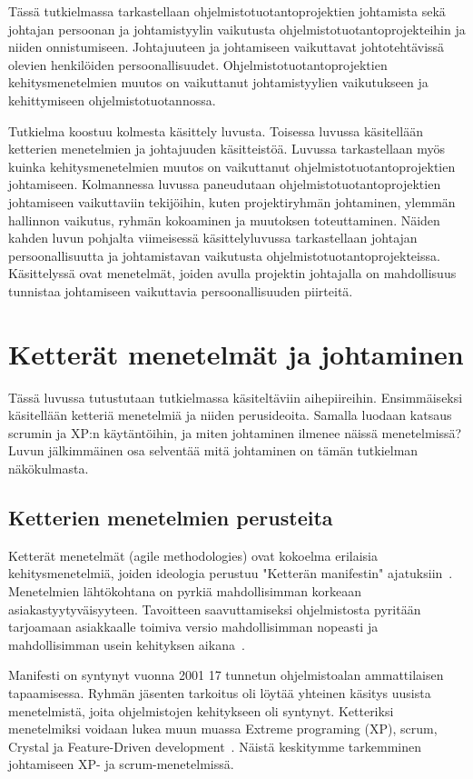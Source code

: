 \documentclass[finnish]{tktltiki2}
\theoremstyle{definition}
\theoremstyle{remark}
\begin{document}
Tässä tutkielmassa tarkastellaan ohjelmistotuotantoprojektien johtamista sekä johtajan persoonan ja johtamistyylin vaikutusta ohjelmistotuotantoprojekteihin ja niiden onnistumiseen. Johtajuuteen ja johtamiseen vaikuttavat johtotehtävissä olevien henkilöiden persoonallisuudet. Ohjelmistotuotantoprojektien kehitysmenetelmien muutos on vaikuttanut johtamistyylien vaikutukseen ja kehittymiseen ohjelmistotuotannossa. 

Tutkielma koostuu kolmesta käsittely luvusta. Toisessa luvussa käsitellään ketterien menetelmien ja johtajuuden käsitteistöä. Luvussa tarkastellaan myös kuinka kehitysmenetelmien muutos on vaikuttanut ohjelmistotuotantoprojektien johtamiseen. Kolmannessa luvussa paneudutaan ohjelmistotuotantoprojektien johtamiseen vaikuttaviin tekijöihin, kuten projektiryhmän johtaminen, ylemmän hallinnon vaikutus, ryhmän kokoaminen ja muutoksen toteuttaminen. Näiden kahden luvun pohjalta viimeisessä  käsittelyluvussa tarkastellaan johtajan persoonallisuutta ja johtamistavan vaikutusta ohjelmistotuotantoprojekteissa. Käsittelyssä ovat menetelmät, joiden avulla projektin johtajalla on mahdollisuus tunnistaa johtamiseen vaikuttavia persoonallisuuden piirteitä.


\section{Ketterät menetelmät ja johtaminen}

Tässä luvussa tutustutaan tutkielmassa käsiteltäviin aihepiireihin. En\-sim\-mäi\-sek\-si käsitellään ketteriä menetelmiä ja niiden perusideoita. Samalla luodaan katsaus scrumin ja XP:n käytäntöihin, ja miten johtaminen ilmenee näissä menetelmissä?  Luvun jälkimmäinen osa selventää mitä johtaminen on tämän tutkielman näkökulmasta.  


\subsection{Ketterien menetelmien perusteita}

Ketterät menetelmät (agile methodologies) ovat kokoelma erilaisia kehitysmenetelmiä, joiden ideologia perustuu "Ketterän manifestin" ajatuksiin~\cite{fowler2001agile}. Menetelmien lähtökohtana on pyrkiä mahdollisimman korkeaan asiakastyytyväisyyteen. Tavoitteen saavuttamiseksi ohjelmistosta pyritään tarjoamaan asiakkaalle toimiva versio mahdollisimman nopeasti ja mahdollisimman usein kehityksen aikana~\cite{fowler2001agile}.

Manifesti on syntynyt vuonna 2001 17 tunnetun ohjelmistoalan ammattilaisen tapaamisessa. Ryhmän jäsenten tarkoitus oli löytää yhteinen käsitys uusista menetelmistä, joita ohjelmistojen kehitykseen oli syntynyt. Ketteriksi menetelmiksi voidaan lukea muun muassa Extreme programing (XP), scrum, Crystal ja Feature-Driven development~\cite{fowler2001agile}.  Näistä keskitymme tarkemminen johtamiseen XP- ja scrum-menetelmissä.
\end{document}
